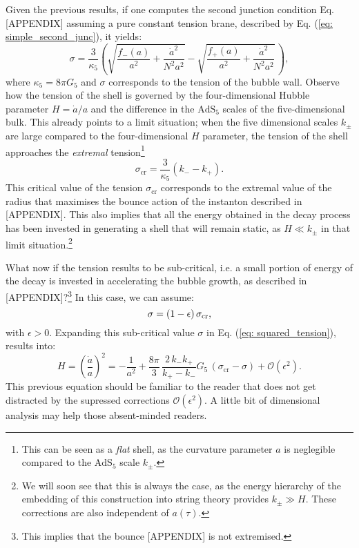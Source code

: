 \documentclass[12pt, a4paper]{article} %
\begin{document}
Given the previous results, if one computes the second junction condition Eq. [APPENDIX] assuming a pure constant tension brane, described by Eq. (\ref{eq: simple_second_junc}), it yields:
\begin{equation}\label{eq: squared_tension}
	\sigma=\frac{3}{\kappa_5}\left(\sqrt{\frac{f_{-}(a)}{a^2}+\frac{\dot{a}^2}{N^2 a^2}}-\sqrt{\frac{f_{+}(a)}{a^2}+\frac{\dot{a}^2}{N^2 a^2}}\,\right),
\end{equation}
where $\kappa_{5} = 8 \pi G_{5}$ and $\sigma$ corresponds to the tension of the bubble wall. Observe how the tension of the shell is governed by the four-dimensional Hubble parameter $H = \dot{a}/a$ and the difference in the $\text{AdS}_{5}$ scales of the five-dimensional bulk. This already points to a limit situation; when the five dimensional scales $k_{\pm}$ are large compared to the four-dimensional $H$ parameter, the tension of the shell approaches the \textit{extremal} tension\footnote{This can be seen as a \textit{flat} shell, as the curvature parameter $a$ is neglegible compared to the $\text{AdS}_{5}$ scale $k_{\pm}$.}
\begin{equation}\label{eq: critical_tension}
	\sigma_{\text{cr}} = \frac{3}{\kappa_{5}} \left(k_{-} - k_{+} \right).
\end{equation}
This critical value of the tension $\sigma_{\text{cr}}$ corresponds to the extremal value of the radius that maximises the bounce action of the instanton described in [APPENDIX]. This also implies that all the energy obtained in the decay process has been invested in generating a shell that will remain static, as $H\ll k_{\pm}$ in that limit situation.\footnote{We will soon see that this is always the case, as the energy hierarchy of the embedding of this construction into string theory provides $k_{\pm} \gg H$. These corrections are also independent of $a(\tau)$.} 

What now if the tension results to be sub-critical, i.e. a small portion of energy of the decay is invested in accelerating the bubble growth, as described in [APPENDIX]?\footnote{This implies that the bounce [APPENDIX] is not extremised.} In this case, we can assume:
\begin{equation}
	\sigma = (1- \epsilon) \, \sigma_{\text{\text{cr}}},
\end{equation}
with $\epsilon > 0$. Expanding this sub-critical value $\sigma$ in Eq. (\ref{eq: squared_tension}), results into:
\begin{equation}\label{eq: friedmann_from_junc}
	H = \left(\frac{\dot{a}}{a}\right)^2=-\frac{1}{a^2}+\frac{8 \pi}{3} \, \frac{ 2 \, k_{-}k_{+}}{k_{+} - k_{-}} G_5\,\left(\sigma_{\text{cr}}-\sigma\right)+\mathcal{O}\left(\epsilon^2\right).
\end{equation}
This previous equation should be familiar to the reader that does not get distracted by the supressed corrections $\mathcal{O}\left(\epsilon^2\right)$. A little bit of dimensional analysis may help those absent-minded readers. 
\end{document}
